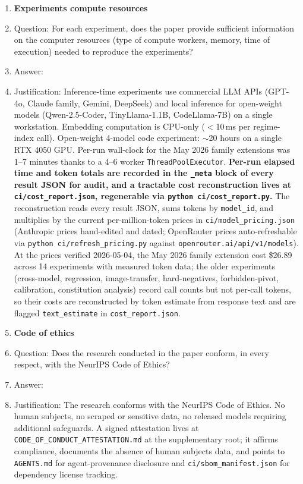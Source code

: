 \begin{enumerate}
\item {\bf Experiments compute resources}
    \item[] Question: For each experiment, does the paper provide sufficient information on the computer resources (type of compute workers, memory, time of execution) needed to reproduce the experiments?
    \item[] Answer: \answerYes{}
    \item[] Justification: Inference-time experiments use commercial LLM APIs (GPT-4o, Claude family, Gemini, DeepSeek) and local inference for open-weight models (Qwen-2.5-Coder, TinyLlama-1.1B, CodeLlama-7B) on a single workstation. Embedding computation is CPU-only ($<$10\,ms per regime-index call). Open-weight 4-model code experiment: $\sim$20 hours on a single RTX 4050 GPU. Per-run wall-clock for the May 2026 family extensions was 1--7 minutes thanks to a 4--6 worker \texttt{ThreadPoolExecutor}. \textbf{Per-run elapsed time and token totals are recorded in the \texttt{\_meta} block of every result JSON for audit, and a tractable cost reconstruction lives at \texttt{ci/cost\_report.json}, regenerable via \texttt{python ci/cost\_report.py}.} The reconstruction reads every result JSON, sums tokens by \texttt{model\_id}, and multiplies by the current per-million-token prices in \texttt{ci/model\_pricing.json} (Anthropic prices hand-edited and dated; OpenRouter prices auto-refreshable via \texttt{python ci/refresh\_pricing.py} against \texttt{openrouter.ai/api/v1/models}). At the prices verified 2026-05-04, the May 2026 family extension cost \$26.89 across 14 experiments with measured token data; the older experiments (cross-model, regression, image-transfer, hard-negatives, forbidden-pivot, calibration, constitution analysis) record call counts but not per-call tokens, so their costs are reconstructed by token estimate from response text and are flagged \texttt{text\_estimate} in \texttt{cost\_report.json}.

\item {\bf Code of ethics}
    \item[] Question: Does the research conducted in the paper conform, in every respect, with the NeurIPS Code of Ethics?
    \item[] Answer: \answerYes{}
    \item[] Justification: The research conforms with the NeurIPS Code of Ethics. No human subjects, no scraped or sensitive data, no released models requiring additional safeguards. A signed attestation lives at \texttt{CODE\_OF\_CONDUCT\_ATTESTATION.md} at the supplementary root; it affirms compliance, documents the absence of human subjects data, and points to \texttt{AGENTS.md} for agent-provenance disclosure and \texttt{ci/sbom\_manifest.json} for dependency license tracking.


\end{enumerate}
